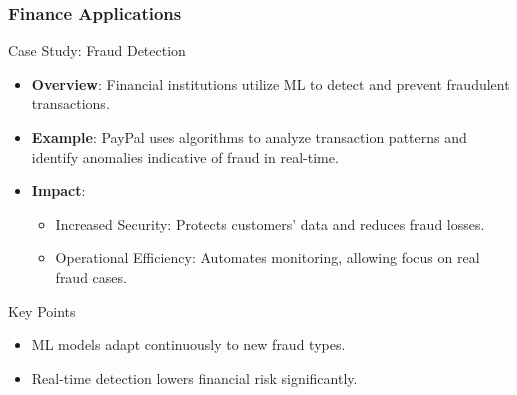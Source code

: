 \documentclass[aspectratio=169]{beamer}
\begin{document}
\begin{frame}[fragile]
    \frametitle{Finance Applications}
    \begin{block}{Case Study: Fraud Detection}
        \begin{itemize}
            \item \textbf{Overview}: Financial institutions utilize ML to detect and prevent fraudulent transactions.
            \item \textbf{Example}: PayPal uses algorithms to analyze transaction patterns and identify anomalies indicative of fraud in real-time.
            \item \textbf{Impact}:
            \begin{itemize}
                \item Increased Security: Protects customers’ data and reduces fraud losses.
                \item Operational Efficiency: Automates monitoring, allowing focus on real fraud cases.
            \end{itemize}
        \end{itemize}
    \end{block}
    \begin{block}{Key Points}
        \begin{itemize}
            \item ML models adapt continuously to new fraud types.
            \item Real-time detection lowers financial risk significantly.
        \end{itemize}
    \end{block}
\end{frame}
\end{document}
